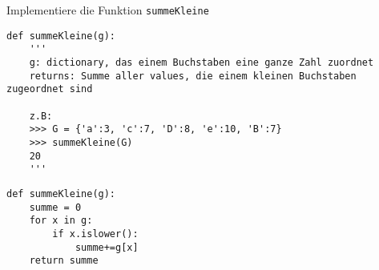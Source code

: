 \question[4] Implementiere die Funktion \texttt{summeKleine}
\begin{lstlisting}
def summeKleine(g):
    '''
    g: dictionary, das einem Buchstaben eine ganze Zahl zuordnet
    returns: Summe aller values, die einem kleinen Buchstaben zugeordnet sind

    z.B:
    >>> G = {'a':3, 'c':7, 'D':8, 'e':10, 'B':7}
    >>> summeKleine(G)
    20
    '''
\end{lstlisting}
\begin{solutionbox}{7cm}
\begin{lstlisting}
def summeKleine(g):
    summe = 0
    for x in g:
        if x.islower():
            summe+=g[x]
    return summe
\end{lstlisting}
\end{solutionbox}
